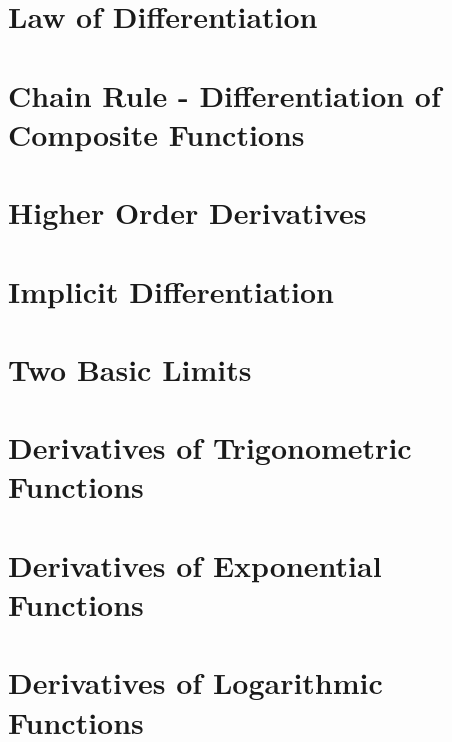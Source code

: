 \documentclass{report}
\begin{document}
\section{Law of Differentiation}

\section{Chain Rule - Differentiation of Composite Functions}

\section{Higher Order Derivatives}

\section{Implicit Differentiation}

\section{Two Basic Limits}

\section{Derivatives of Trigonometric Functions}

\section{Derivatives of Exponential Functions}

\section{Derivatives of Logarithmic Functions}
\end{document}
